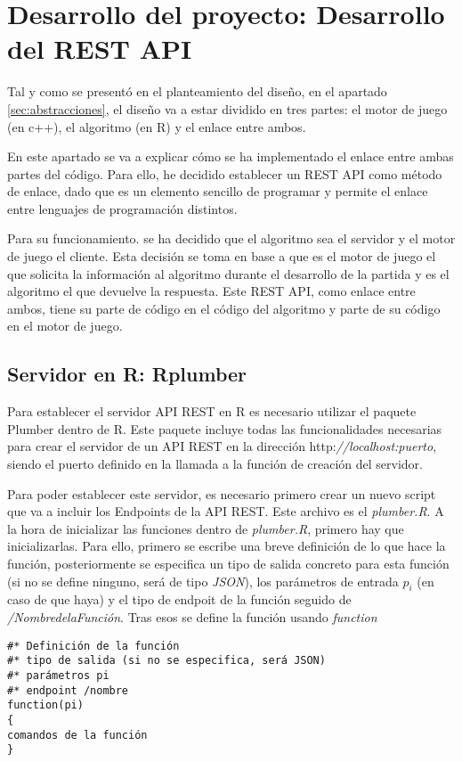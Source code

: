 \chapter{Desarrollo del proyecto: Desarrollo del REST API}


Tal y como se presentó en el planteamiento del diseño, en el apartado \ref{sec:abstracciones}, el diseño va a estar dividido en tres partes: el motor de juego (en c++), el algoritmo (en R) y el enlace entre ambos. 

En este apartado se va a explicar cómo se ha implementado el enlace entre ambas partes del código. Para ello, he decidido establecer un REST API como método de enlace, dado que es un elemento sencillo de programar y permite el enlace entre lenguajes de programación distintos.

Para su funcionamiento. se ha decidido que el algoritmo sea el servidor y el motor de juego el cliente. Esta decisión se toma en base a que es el motor de juego el que solicita la información al algoritmo durante el desarrollo de la partida y es el algoritmo el que devuelve la respuesta.
Este REST API, como enlace entre ambos, tiene su parte de código en el código del algoritmo y parte de su código en el motor de juego.

\section{Servidor en R: Rplumber}
\label{sec:rplumber}

Para establecer el servidor API REST en R es necesario utilizar el paquete Plumber  dentro de R. Este paquete incluye todas las funcionalidades necesarias para crear el servidor de un API REST en la dirección http:\textit{//localhost:puerto}, siendo el puerto definido en la llamada a la función de creación del servidor.

Para poder establecer este servidor, es necesario primero crear un nuevo script que va a incluir los Endpoints de la API REST. Este archivo es el \textit{plumber.R}. A la hora de inicializar las funciones dentro de \textit{plumber.R}, primero hay que inicializarlas. Para ello, primero se escribe una breve definición de lo que hace la función, posteriormente se especifica un tipo de salida concreto para esta función (si no se define ninguno, será de tipo \textit{JSON}), los parámetros de entrada $p_i$ (en caso de que haya) y el tipo de endpoit de la función seguido de \textit{/NombredelaFunción}.  Tras esos se define la función usando \textit{function}
\begin{verbatim}
#* Definición de la función
#* tipo de salida (si no se especifica, será JSON)
#* parámetros pi
#* endpoint /nombre
function(pi)
{
comandos de la función
}
\end{verbatim}

